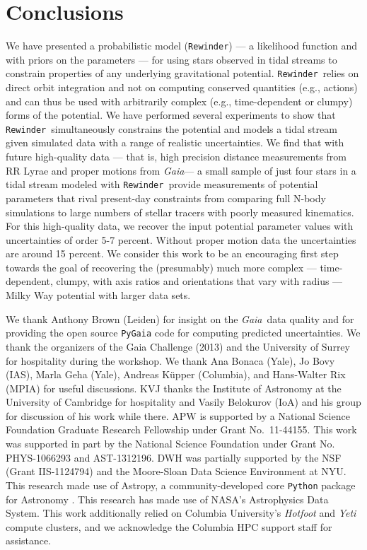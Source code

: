 \documentclass{emulateapj}
\newcommand{\project}[1]{\textsl{#1}}
\newcommand{\gaia}{\project{Gaia}}
\newcommand{\rewinder}{\texttt{Rewinder}}
\begin{document}

\section{Conclusions}\label{sec:conclusion}
We have presented a probabilistic model (\rewinder) --- a likelihood function and with priors on the parameters --- for using stars observed in tidal streams to constrain properties of any underlying gravitational potential. \rewinder\ relies on direct orbit integration and not on computing conserved quantities (e.g., actions) and can thus be used with arbitrarily complex (e.g., time-dependent or clumpy) forms of the potential. We have performed several experiments to show that \rewinder\ simultaneously constrains the potential and models a tidal stream given simulated data with a range of realistic uncertainties. We find that with future high-quality data --- that is, high precision distance measurements from RR Lyrae and proper motions from \gaia --- a small sample of just four stars in a tidal stream modeled with \rewinder\, provide measurements of potential parameters that rival present-day constraints from comparing full N-body simulations to large numbers of stellar tracers with poorly measured kinematics. For this high-quality data, we recover the input potential parameter values with uncertainties of order 5-7 percent. Without proper motion data the uncertainties are around 15 percent. We consider this work to be an encouraging first step towards the goal of recovering the (presumably) much more complex --- time-dependent, clumpy, with axis ratios and orientations that vary with radius --- Milky Way potential with larger data sets.

\acknowledgements
We thank Anthony Brown (Leiden) for insight on the \gaia\, data quality and for providing the open source \texttt{PyGaia} code for computing predicted uncertainties. We thank the organizers of the Gaia Challenge (2013) and the University of Surrey for hospitality during the workshop. We thank Ana Bonaca (Yale), Jo Bovy (IAS), Marla Geha (Yale), Andreas K{\"u}pper (Columbia), and Hans-Walter Rix (MPIA) for useful discussions.
KVJ thanks the Institute of Astronomy at the University of Cambridge for hospitality and Vasily Belokurov (IoA) and his group for discussion of his work while there.
APW is supported by a National Science Foundation Graduate Research Fellowship under Grant No.\ 11-44155. This work was supported in part by the National Science Foundation under Grant No. PHYS-1066293 and AST-1312196. 
DWH was partially supported by the NSF (Grant IIS-1124794) and the Moore-Sloan Data Science Environment at NYU.
This research made use of Astropy, a community-developed core \texttt{Python} package for Astronomy \citep{astropy13}. This research has made use of NASA's Astrophysics Data System.
This work additionally relied on Columbia University's \emph{Hotfoot} and \emph{Yeti} compute clusters, and we acknowledge the Columbia HPC support staff for assistance. \\



\end{document}
